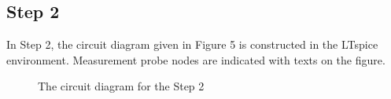 \documentclass[letterpaper,12pt]{article}
\begin{document}
\subsection{Step 2}
In Step 2, the circuit diagram given in Figure 5 is constructed in the LTspice environment. Measurement probe nodes are indicated with texts on the figure.
\begin{figure}[H] 
	\caption{The circuit diagram for the Step 2}
\end{figure}
\end{document}
